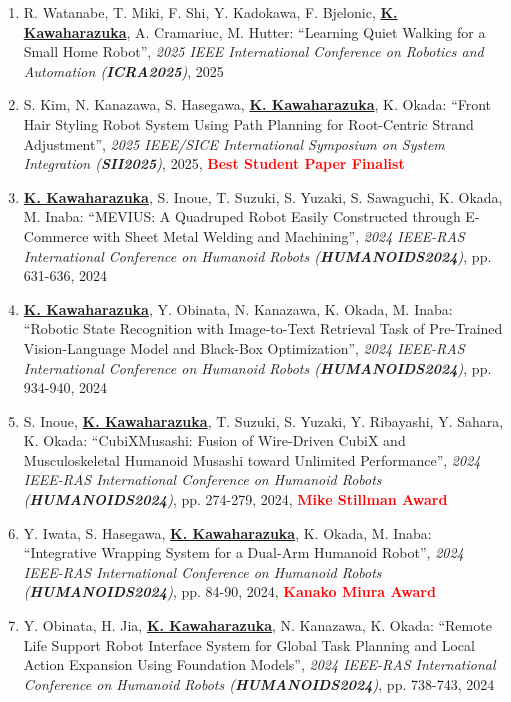 \documentclass[letterpaper]{article}
\begin{document}
\begin{enumerate}
\item R. Watanabe, T. Miki, F. Shi, Y. Kadokawa, F. Bjelonic, \underline{\textbf{K. Kawaharazuka}}, A. Cramariuc, M. Hutter: ``Learning Quiet Walking for a Small Home Robot'', \textit{2025 IEEE International Conference on Robotics and Automation (\textit{\textbf{ICRA2025}})}, 2025
\item S. Kim, N. Kanazawa, S. Hasegawa, \underline{\textbf{K. Kawaharazuka}}, K. Okada: ``Front Hair Styling Robot System Using Path Planning for Root-Centric Strand Adjustment'', \textit{2025 IEEE/SICE International Symposium on System Integration (\textit{\textbf{SII2025}})}, 2025, \textbf{\textcolor{red}{Best Student Paper Finalist}}
\item \underline{\textbf{K. Kawaharazuka}}, S. Inoue, T. Suzuki, S. Yuzaki, S. Sawaguchi, K. Okada, M. Inaba: ``MEVIUS: A Quadruped Robot Easily Constructed through E-Commerce with Sheet Metal Welding and Machining'', \textit{2024 IEEE-RAS International Conference on Humanoid Robots (\textit{\textbf{HUMANOIDS2024}})}, pp. 631-636, 2024
\item \underline{\textbf{K. Kawaharazuka}}, Y. Obinata, N. Kanazawa, K. Okada, M. Inaba: ``Robotic State Recognition with Image-to-Text Retrieval Task of Pre-Trained Vision-Language Model and Black-Box Optimization'', \textit{2024 IEEE-RAS International Conference on Humanoid Robots (\textit{\textbf{HUMANOIDS2024}})}, pp. 934-940, 2024
\item S. Inoue, \underline{\textbf{K. Kawaharazuka}}, T. Suzuki, S. Yuzaki, Y. Ribayashi, Y. Sahara, K. Okada: ``CubiXMusashi: Fusion of Wire-Driven CubiX and Musculoskeletal Humanoid Musashi toward Unlimited Performance'', \textit{2024 IEEE-RAS International Conference on Humanoid Robots (\textit{\textbf{HUMANOIDS2024}})}, pp. 274-279, 2024, \textbf{\textcolor{red}{Mike Stillman Award}}
\item Y. Iwata, S. Hasegawa, \underline{\textbf{K. Kawaharazuka}}, K. Okada, M. Inaba: ``Integrative Wrapping System for a Dual-Arm Humanoid Robot'', \textit{2024 IEEE-RAS International Conference on Humanoid Robots (\textit{\textbf{HUMANOIDS2024}})}, pp. 84-90, 2024, \textbf{\textcolor{red}{Kanako Miura Award}}
\item Y. Obinata, H. Jia, \underline{\textbf{K. Kawaharazuka}}, N. Kanazawa, K. Okada: ``Remote Life Support Robot Interface System for Global Task Planning and Local Action Expansion Using Foundation Models'', \textit{2024 IEEE-RAS International Conference on Humanoid Robots (\textit{\textbf{HUMANOIDS2024}})}, pp. 738-743, 2024

\end{enumerate}
\end{document}
